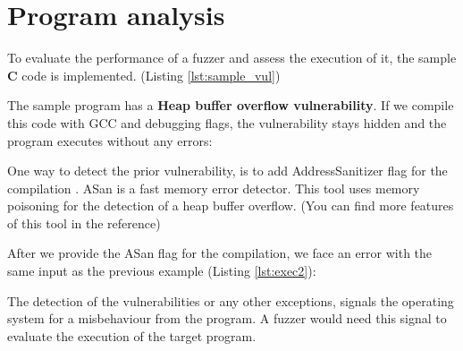 \section{Program analysis} \label{sec:2.3}

To evaluate the performance of a fuzzer and assess the execution of it, the sample \textbf{C} code is implemented. (Listing \ref{lst:sample_vul}) \cite{sample_code_ref}



The sample program has a \textbf{Heap buffer overflow vulnerability}. If we compile this code with GCC and debugging flags, the vulnerability stays hidden and the program executes without any errors:



One way to detect the prior vulnerability, is to add AddressSanitizer flag for the compilation \cite{address_san}. ASan is a fast memory error detector. This tool uses memory poisoning for the detection of a heap buffer overflow. (You can find more features of this tool in the reference) \cite{serebryany2012addresssanitizer}

After we provide the ASan flag for the compilation, we face an error with the same input as the previous example (Listing \ref{lst:exec2}):



The detection of the vulnerabilities or any other exceptions, signals the operating system for a misbehaviour from the program. A fuzzer would need this signal to evaluate the execution of the target program.